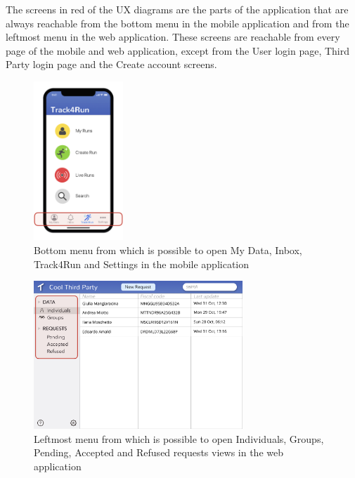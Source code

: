 The screens in red of the UX diagrams are the parts of the application that are always reachable from the bottom menu in the mobile application and from the leftmost menu in the web application. These screens are reachable from every page of the mobile and web application, except from the User login page, Third Party login page and the Create account screens.

\begin{figure}[H]
    \centering
    \includegraphics[width=0.3\textwidth]{./Pictures/ux-highlight-mobile.jpeg}
    \caption{Bottom menu from which is possible to open My Data, Inbox, Track4Run and Settings in the mobile application}
\end{figure}

\begin{figure}[H]
    \centering
    \includegraphics[width=0.7\textwidth]{./Pictures/ux-highlight-web.jpeg}
    \caption{Leftmost menu from which is possible to open Individuals, Groups, Pending, Accepted and Refused requests views in the web application}
\end{figure}
